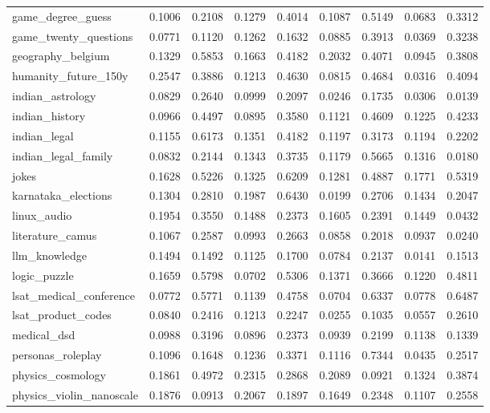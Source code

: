 \documentclass[pdflatex,sn-mathphys-num]{sn-jnl}%
\theoremstyle{thmstyleone}%
\theoremstyle{thmstyletwo}%
\theoremstyle{thmstylethree}%
\begin{document}
\begin{appendices}
\begin{landscape}
\begin{longtable}{@{}p{3.8cm}cccccccc@{}}
game\_degree\_guess & 0.1006 & 0.2108 & 0.1279 & 0.4014 & 0.1087 & 0.5149 & 0.0683 & 0.3312 \\
game\_twenty\_questions & 0.0771 & 0.1120 & 0.1262 & 0.1632 & 0.0885 & 0.3913 & 0.0369 & 0.3238 \\
geography\_belgium & 0.1329 & 0.5853 & 0.1663 & 0.4182 & 0.2032 & 0.4071 & 0.0945 & 0.3808 \\
humanity\_future\_150y & 0.2547 & 0.3886 & 0.1213 & 0.4630 & 0.0815 & 0.4684 & 0.0316 & 0.4094 \\
indian\_astrology & 0.0829 & 0.2640 & 0.0999 & 0.2097 & 0.0246 & 0.1735 & 0.0306 & 0.0139 \\
indian\_history & 0.0966 & 0.4497 & 0.0895 & 0.3580 & 0.1121 & 0.4609 & 0.1225 & 0.4233 \\
indian\_legal & 0.1155 & 0.6173 & 0.1351 & 0.4182 & 0.1197 & 0.3173 & 0.1194 & 0.2202 \\
indian\_legal\_family & 0.0832 & 0.2144 & 0.1343 & 0.3735 & 0.1179 & 0.5665 & 0.1316 & 0.0180 \\
jokes & 0.1628 & 0.5226 & 0.1325 & 0.6209 & 0.1281 & 0.4887 & 0.1771 & 0.5319 \\
karnataka\_elections & 0.1304 & 0.2810 & 0.1987 & 0.6430 & 0.0199 & 0.2706 & 0.1434 & 0.2047 \\
linux\_audio & 0.1954 & 0.3550 & 0.1488 & 0.2373 & 0.1605 & 0.2391 & 0.1449 & 0.0432 \\
literature\_camus & 0.1067 & 0.2587 & 0.0993 & 0.2663 & 0.0858 & 0.2018 & 0.0937 & 0.0240 \\
llm\_knowledge & 0.1494 & 0.1492 & 0.1125 & 0.1700 & 0.0784 & 0.2137 & 0.0141 & 0.1513 \\
logic\_puzzle & 0.1659 & 0.5798 & 0.0702 & 0.5306 & 0.1371 & 0.3666 & 0.1220 & 0.4811 \\
lsat\_medical\_conference & 0.0772 & 0.5771 & 0.1139 & 0.4758 & 0.0704 & 0.6337 & 0.0778 & 0.6487 \\
lsat\_product\_codes & 0.0840 & 0.2416 & 0.1213 & 0.2247 & 0.0255 & 0.1035 & 0.0557 & 0.2610 \\
medical\_dsd & 0.0988 & 0.3196 & 0.0896 & 0.2373 & 0.0939 & 0.2199 & 0.1138 & 0.1339 \\
personas\_roleplay & 0.1096 & 0.1648 & 0.1236 & 0.3371 & 0.1116 & 0.7344 & 0.0435 & 0.2517 \\
physics\_cosmology & 0.1861 & 0.4972 & 0.2315 & 0.2868 & 0.2089 & 0.0921 & 0.1324 & 0.3874 \\
physics\_violin\_nanoscale & 0.1876 & 0.0913 & 0.2067 & 0.1897 & 0.1649 & 0.2348 & 0.1107 & 0.2558 \\

\end{longtable}
\end{landscape}
\end{appendices}
\end{document}
